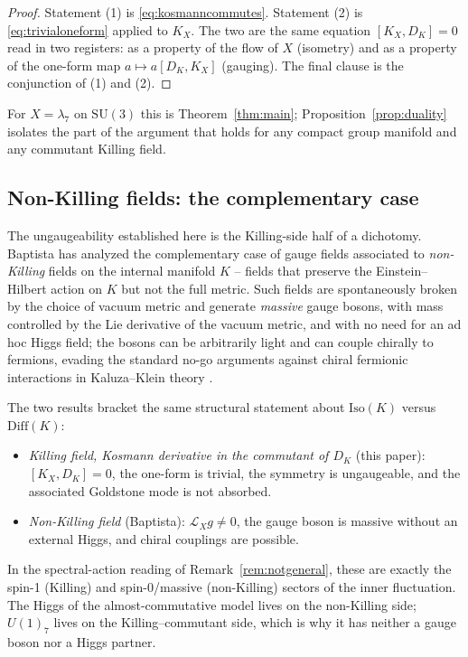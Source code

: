 \documentclass[12pt]{article}
\theoremstyle{definition}
\theoremstyle{remark}
\newcommand{\Lie}{\mathcal{L}}
\begin{document}
\begin{proof}
Statement (1) is \eqref{eq:kosmanncommutes}.  Statement (2) is \eqref{eq:trivialoneform} applied to $K_X$.  The two are the same equation $[K_X, D_K] = 0$ read in two registers: as a property of the flow of $X$ (isometry) and as a property of the one-form map $a \mapsto a[D_K, K_X]$ (gauging).  The final clause is the conjunction of (1) and (2).
\end{proof}

For $X = \lambda_7$ on $\mathrm{SU}(3)$ this is Theorem~\ref{thm:main}; Proposition~\ref{prop:duality} isolates the part of the argument that holds for any compact group manifold and any commutant Killing field.

\subsection{Non-Killing fields: the complementary case}
\label{subsec:nonkilling}

The ungaugeability established here is the Killing-side half of a dichotomy.  Baptista \cite{Baptista2024KK, Baptista2025chiral} has analyzed the complementary case of gauge fields associated to \emph{non-Killing} fields on the internal manifold $K$ -- fields that preserve the Einstein--Hilbert action on $K$ but not the full metric.  Such fields are spontaneously broken by the choice of vacuum metric and generate \emph{massive} gauge bosons, with mass controlled by the Lie derivative of the vacuum metric, and with no need for an ad hoc Higgs field; the bosons can be arbitrarily light and can couple chirally to fermions, evading the standard no-go arguments against chiral fermionic interactions in Kaluza--Klein theory \cite{Baptista2024KK, Baptista2025chiral}.

The two results bracket the same structural statement about $\mathrm{Iso}(K)$ versus $\mathrm{Diff}(K)$:
\begin{itemize}
  \item \emph{Killing field, Kosmann derivative in the commutant of $D_K$} (this paper): $[K_X, D_K] = 0$, the one-form is trivial, the symmetry is ungaugeable, and the associated Goldstone mode is not absorbed.
  \item \emph{Non-Killing field} (Baptista): $\Lie_X g \neq 0$, the gauge boson is massive without an external Higgs, and chiral couplings are possible.
\end{itemize}
In the spectral-action reading of Remark~\ref{rem:notgeneral}, these are exactly the spin-1 (Killing) and spin-0/massive (non-Killing) sectors of the inner fluctuation.  The Higgs of the almost-commutative model lives on the non-Killing side; $U(1)_7$ lives on the Killing--commutant side, which is why it has neither a gauge boson nor a Higgs partner.
\end{document}
